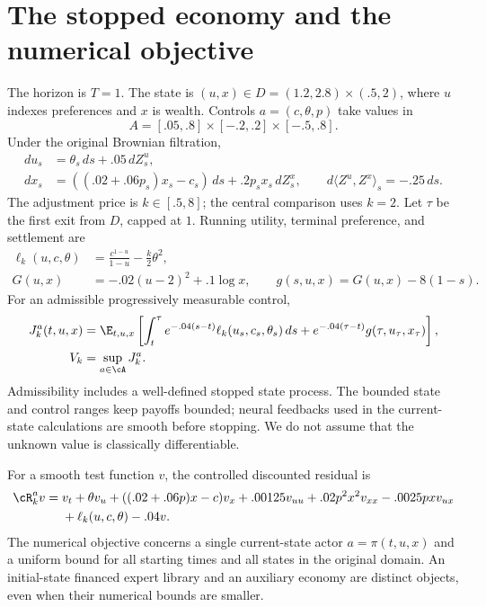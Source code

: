 \section{The stopped economy and the numerical objective}\label{sec:economy}
The horizon is $T=1$. The state is $(u,x)\in D=(1.2,2.8)\times(.5,2)$, where $u$ indexes preferences and $x$ is wealth. Controls $a=(c,\theta,p)$ take values in
\[
 A=[.05,.8]\times[-.2,.2]\times[-.5,.8].
\]
Under the original Brownian filtration,
\begin{align}
 du_s&=\theta_s\,ds+.05\,dZ_s^u,\\
 dx_s&=((.02+.06p_s)x_s-c_s)\,ds+.2p_sx_s\,dZ_s^x,
 \qquad d\langle Z^u,Z^x\rangle_s=-.25\,ds.\label{eq:economy}
\end{align}
The adjustment price is $k\in[.5,8]$; the central comparison uses $k=2$. Let $\tau$ be the first exit from $D$, capped at $1$. Running utility, terminal preference, and settlement are
\begin{align}
 \ell_k(u,c,\theta)&=\frac{c^{1-u}}{1-u}-\frac{k}{2}\theta^2,\\
 G(u,x)&=-.02(u-2)^2+.1\log x,\qquad
 g(s,u,x)=G(u,x)-8(1-s).
\end{align}
For an admissible progressively measurable control,
\begin{align}
 J_k^a(t,u,x)&=\E_{t,u,x}\left[\int_t^\tau e^{-.04(s-t)}\ell_k(u_s,c_s,\theta_s)\,ds
 +e^{-.04(\tau-t)}g(\tau,u_\tau,x_\tau)\right],\notag\\
 V_k&=\sup_{a\in\cA}J_k^a.\label{eq:value}
\end{align}
Admissibility includes a well-defined stopped state process. The bounded state and control ranges keep payoffs bounded; neural feedbacks used in the current-state calculations are smooth before stopping. We do not assume that the unknown value is classically differentiable.

For a smooth test function $v$, the controlled discounted residual is
\begin{align}
 \cR_k^a v={}&v_t+\theta v_u+((.02+.06p)x-c)v_x+.00125v_{uu}
 +.02p^2x^2v_{xx}-.0025pxv_{ux}\notag\\
 &+\ell_k(u,c,\theta)-.04v.\label{eq:residual}
\end{align}
The numerical objective concerns a single current-state actor $a=\pi(t,u,x)$ and a uniform bound for all starting times and all states in the original domain. An initial-state financed expert library and an auxiliary economy are distinct objects, even when their numerical bounds are smaller.

